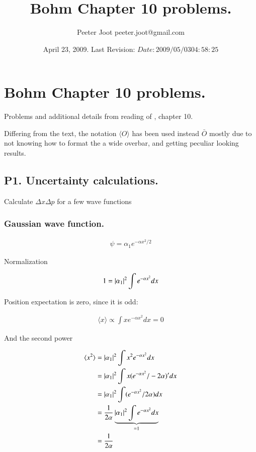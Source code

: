 \documentclass{article}
\title{ Bohm Chapter 10 problems. }
\author{Peeter Joot \quad peeter.joot@gmail.com }
\date{ April 23, 2009.  Last Revision: $Date: 2009/05/03 04:58:25 $ }
\newcommand{\expectation}[1]{\langle{#1}\rangle}
\begin{document}
\maketitle{}
\tableofcontents
\section{ Bohm Chapter 10 problems. }

Problems and additional details from reading of \cite{bohm1989qt}, chapter 10.

Differing from the text, the notation $\expectation{O}$ has been used instead $\bar{O}$ mostly due to not knowing how to format the a wide overbar, and getting peculiar looking results.

\subsection{ P1. Uncertainty calculations. }

Calculate $\Delta x \Delta p$ for a few wave functions

\subsubsection{ Gaussian wave function. }

\begin{align*}
\psi = \alpha_1 e^{-\alpha x^2/2}
\end{align*}

Normalization

\begin{align*}
1 
&= \left\lvert{\alpha_1}\right\rvert^2 \int e^{-\alpha x^2} dx \\
\end{align*}

Position expectation is zero, since it is odd:

\begin{align*}
\expectation{x} \propto \int x e^{-\alpha x^2} dx = 0
\end{align*}

And the second power

\begin{align*}
\expectation{x^2} 
&= \Abs{\alpha_1}^2 \int x^2 e^{-\alpha x^2} dx \\
&= \Abs{\alpha_1}^2 \int x (e^{-\alpha x^2}/-2\alpha)' dx \\
&= \Abs{\alpha_1}^2 \int (e^{-\alpha x^2}/2\alpha) dx \\
&= \inv{2\alpha} \underbrace{\Abs{\alpha_1}^2 \int e^{-\alpha x^2} dx}_{=1} \\
&= \inv{2\alpha}
\end{align*}
\end{document}
